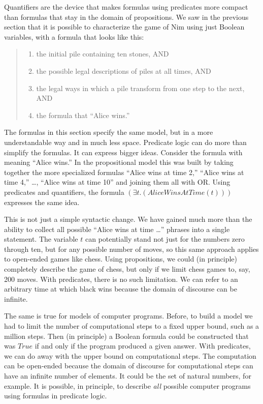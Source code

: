 {Quantifiers are the device that makes formulas using predicates more compact than
formulas that stay in the domain of propositions.
We saw in the previous section that it
is possible to characterize the game of Nim using just Boolean variables, with a formula that looks like this:
\begin{quote}
\begin{enumerate}
\item the initial pile containing ten stones, AND
\item the possible legal descriptions of piles at all times, AND
\item the legal ways in which a pile transform from one step to the next, AND
\item the formula that ``Alice wins.''
\end{enumerate}
\end{quote}

The formulas in this section specify the same model, but in a more understandable
way and in much less space.
Predicate logic can do more than simplify the formulas.
It can express bigger ideas.
Consider the formula with meaning ``Alice wins.''
In the propositional model this was built by taking together the more specialized formulas
``Alice wins at time 2,'' ``Alice wins at time 4,'' \dots, ``Alice wins at time 10''
and joining them all with OR.
Using predicates and quantifiers, the formula $(\exists t.(AliceWinsAtTime(t)))$ expresses
the same idea.

This is not just a simple syntactic change.
We have gained much more than the ability to
collect all possible ``Alice wins at time \dots'' phrases into a single statement.
The variable $t$ can potentially stand not just for the numbers zero through ten,
but for any possible number of moves, so
this same approach applies to open-ended games like chess.
Using propositions, we could (in principle)
completely describe the game of chess, but only if we limit chess games to, say, 200 moves.
With predicates, there is no such limitation.
We can refer to an arbitrary time at which black wins because the domain of discourse
can be infinite.

The same is true for models of computer programs.
Before, to build a model we had to limit the number of computational steps to a fixed upper bound,
such as a million steps.
Then (in principle)
a Boolean formula could be constructed that was $True$
if and only if the program produced a given answer.
With predicates, we can do away with the upper bound on computational steps.
The computation can be open-ended because the domain of discourse for computational steps
can have an infinite number of elements. It could be the set of natural numbers, for example.
It is possible, in principle, to describe \emph{all} possible computer programs
using formulas in predicate logic.

}
